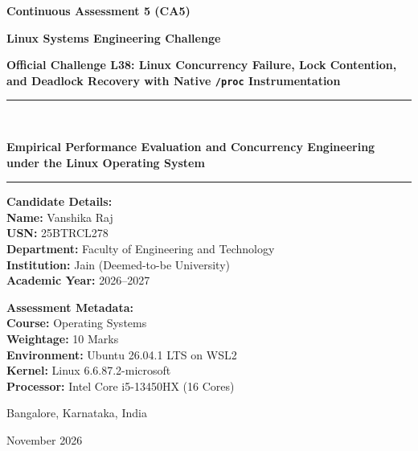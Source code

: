 \documentclass[11pt,a4paper]{article}
\begin{document}
\begin{titlepage}
    \centering
    \vspace*{1.5cm}
    
    {\Huge\bfseries Continuous Assessment 5 (CA5) \par}
    \vspace{0.4cm}
    {\LARGE\bfseries Linux Systems Engineering Challenge \par}
    \vspace{0.8cm}
    {\Large\bfseries Official Challenge L38: Linux Concurrency Failure, Lock Contention, and Deadlock Recovery with Native \texttt{/proc} Instrumentation \par}
    \vspace{1.0cm}
    
    \rule{\linewidth}{1.2pt} \\[0.4cm]
    {\huge\bfseries Empirical Performance Evaluation and Concurrency Engineering under the Linux Operating System \par}
    \rule{\linewidth}{1.2pt}
    
    \vspace{1.8cm}
    
    \begin{minipage}{0.5\textwidth}
        \begin{flushleft} \large
            \textbf{Candidate Details:} \\
            \textbf{Name:} Vanshika Raj \\
            \textbf{USN:} 25BTRCL278 \\
            \textbf{Department:} Faculty of Engineering and Technology \\
            \textbf{Institution:} Jain (Deemed-to-be University) \\
            \textbf{Academic Year:} 2026--2027
        \end{flushleft}
    \end{minipage}
    \begin{minipage}{0.48\textwidth}
        \begin{flushright} \large
            \textbf{Assessment Metadata:} \\
            \textbf{Course:} Operating Systems \\
            \textbf{Weightage:} 10 Marks \\
            \textbf{Environment:} Ubuntu 26.04.1 LTS on WSL2 \\
            \textbf{Kernel:} Linux 6.6.87.2-microsoft \\
            \textbf{Processor:} Intel Core i5-13450HX (16 Cores)
        \end{flushright}
    \end{minipage}
    
    \vfill
    
    {\large Bangalore, Karnataka, India \par}
    {\large November 2026 \par}
\end{titlepage}
\end{document}
